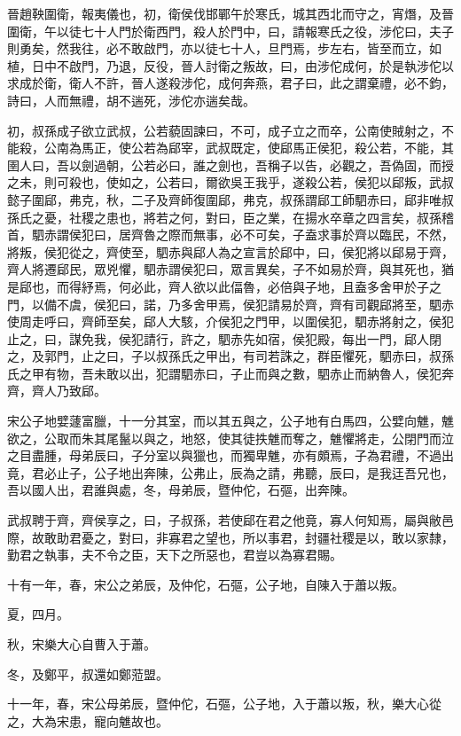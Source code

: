 \begin{pinyinscope}
晉趙鞅圍衛，報夷儀也，初，衛侯伐邯鄲午於寒氏，城其西北而守之，宵熸，及晉圍衛，午以徒七十人門於衛西門，殺人於門中，曰，請報寒氏之役，涉佗曰，夫子則勇矣，然我往，必不敢啟門，亦以徒七十人，旦門焉，步左右，皆至而立，如植，日中不啟門，乃退，反役，晉人討衛之叛故，曰，由涉佗成何，於是執涉佗以求成於衛，衛人不許，晉人遂殺涉佗，成何奔燕，君子曰，此之謂棄禮，必不鈞，詩曰，人而無禮，胡不遄死，涉佗亦遄矣哉。

初，叔孫成子欲立武叔，公若藐固諫曰，不可，成子立之而卒，公南使賊射之，不能殺，公南為馬正，使公若為郈宰，武叔既定，使郈馬正侯犯，殺公若，不能，其圉人曰，吾以劍過朝，公若必曰，誰之劍也，吾稱子以告，必觀之，吾偽固，而授之未，則可殺也，使如之，公若曰，爾欲吳王我乎，遂殺公若，侯犯以郈叛，武叔懿子圍郈，弗克，秋，二子及齊師復圍郈，弗克，叔孫謂郈工師駟赤曰，郈非唯叔孫氏之憂，社稷之患也，將若之何，對曰，臣之業，在揚水卒章之四言矣，叔孫稽首，駟赤謂侯犯曰，居齊魯之際而無事，必不可矣，子盍求事於齊以臨民，不然，將叛，侯犯從之，齊使至，駟赤與郈人為之宣言於郈中，曰，侯犯將以郈易于齊，齊人將遷郈民，眾兇懼，駟赤謂侯犯曰，眾言異矣，子不如易於齊，與其死也，猶是郈也，而得紓焉，何必此，齊人欲以此偪魯，必倍與子地，且盍多舍甲於子之門，以備不虞，侯犯曰，諾，乃多舍甲焉，侯犯請易於齊，齊有司觀郈將至，駟赤使周走呼曰，齊師至矣，郈人大駭，介侯犯之門甲，以圍侯犯，駟赤將射之，侯犯止之，曰，謀免我，侯犯請行，許之，駟赤先如宿，侯犯殿，每出一門，郈人閉之，及郭門，止之曰，子以叔孫氏之甲出，有司若誅之，群臣懼死，駟赤曰，叔孫氏之甲有物，吾未敢以出，犯謂駟赤曰，子止而與之數，駟赤止而納魯人，侯犯奔齊，齊人乃致郈。

宋公子地嬖蘧富臘，十一分其室，而以其五與之，公子地有白馬四，公嬖向魋，魋欲之，公取而朱其尾鬣以與之，地怒，使其徒抶魋而奪之，魋懼將走，公閉門而泣之目盡腫，母弟辰曰，子分室以與獵也，而獨卑魋，亦有頗焉，子為君禮，不過出竟，君必止子，公子地出奔陳，公弗止，辰為之請，弗聽，辰曰，是我迋吾兄也，吾以國人出，君誰與處，冬，母弟辰，暨仲佗，石彄，出奔陳。

武叔聘于齊，齊侯享之，曰，子叔孫，若使郈在君之他竟，寡人何知焉，屬與敝邑際，故敢助君憂之，對曰，非寡君之望也，所以事君，封疆社稷是以，敢以家隸，勤君之執事，夫不令之臣，天下之所惡也，君豈以為寡君賜。

十有一年，春，宋公之弟辰，及仲佗，石彄，公子地，自陳入于蕭以叛。

夏，四月。

秋，宋樂大心自曹入于蕭。

冬，及鄭平，叔還如鄭蒞盟。

十一年，春，宋公母弟辰，暨仲佗，石彄，公子地，入于蕭以叛，秋，樂大心從之，大為宋患，寵向魋故也。


\end{pinyinscope}
